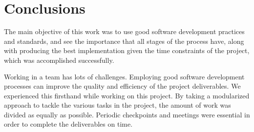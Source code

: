 \documentclass[12pt,a4paper]{article}
\begin{document}
%
%
%
%
%
%
%
%
%
%
%
%
%
%
%
%
%


%			
%
%

\clearpage

\section{Conclusions}

The main objective of this work was to use good software development practices and standards, and see the importance that all stages of the process have, along with producing the best implementation given the time constraints of the project, which was accomplished successfully. 

Working in a team has lots of challenges. Employing good software development processes can improve the quality and efficiency of the project deliverables. We experienced this firsthand while working on this project. By taking a modularized approach to tackle the various tasks in the project, the amount of work was divided as equally as possible. Periodic checkpoints and meetings were essential in order to complete the deliverables on time. 
\end{document}
